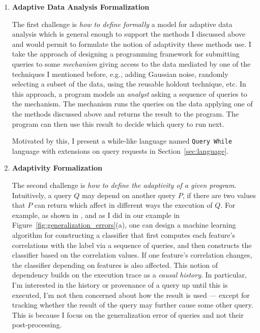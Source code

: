 \begin{enumerate}
 \item
 \textbf{Adaptive Data Analysis Formalization}

The first challenge is \emph{how to define formally} a model for adaptive data analysis which is general enough to support the methods I discussed above and would permit to formulate the notion of adaptivity these methods use. 
I take the approach of designing a programming framework for submitting queries to some \emph{mechanism} giving access to the data mediated by one of the techniques I mentioned before, e.g., adding Gaussian noise, randomly selecting a subset of the data, using the reusable holdout technique, etc. 
In this approach, a program models an \emph{analyst} asking a sequence of queries to the mechanism. The mechanism runs the queries on the data applying one of the methods discussed above and returns the result to the program. The program can then use this result to decide which query to run next. 

Motivated by this, I present a while-like language named {\tt Query While} language with extensions on query requests in Section~\ref{sec:language}.

\item 
\textbf{Adaptivity Formalization}

The second challenge is \emph{how to define the adaptivity of a given program}.
Intuitively, a query $Q$ may depend on another query $P$, if there are two values that $P$ can return which affect in different ways the execution of $Q$. 
For example, as shown in \cite{dwork2015reusable}, and as I did in our example in Figure~\ref{fig:generalization_errors}(a), one can design a machine learning algorithm for constructing a classifier that first computes each feature's correlations with the label via a sequence of queries, and then constructs the classifier based on the correlation values. 
If one feature's correlation changes, the classifier depending on features is also affected. 
This notion of dependency builds on the execution trace as a \emph{causal history}. 
In particular, I'm interested in the history or provenance of a query up until this is executed, I'm not then concerned about how the result is used --- except for tracking whether the result of the query may further cause some other query. 
This is because I focus on the generalization error of queries and not their post-processing. %


\end{enumerate}
